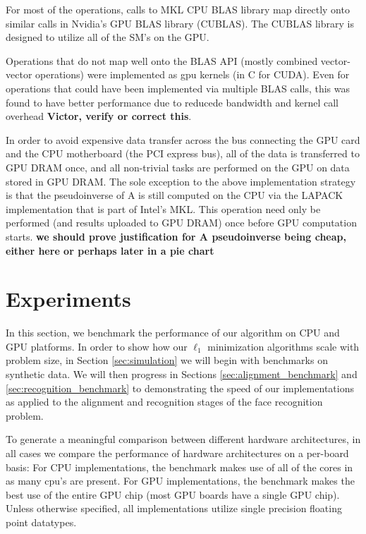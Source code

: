 \documentclass[10pt,twocolumn,letterpaper]{article}
\begin{document}
For most of the operations, calls to MKL CPU BLAS library map directly onto
similar calls in Nvidia's GPU BLAS library (CUBLAS).  The CUBLAS library is
designed to utilize all of the SM's on the GPU.  

Operations that do not map well onto the BLAS API (mostly combined
vector-vector operations) were implemented as gpu kernels (in C for CUDA).
Even for operations that could have been implemented via multiple BLAS calls,
this was found to have better performance due to reducede bandwidth and kernel
call overhead {\bf Victor, verify or correct this}.

In order to avoid expensive data transfer across the bus connecting the GPU
card and the CPU motherboard (the PCI express bus), all of the data is
transferred to GPU DRAM once, and all non-trivial tasks are performed on the
GPU on data stored in GPU DRAM.  The sole exception to the above implementation
strategy is that the pseudoinverse of A is still computed on the CPU via the
LAPACK implementation that is part of Intel's MKL. This operation need only be
performed (and results uploaded to GPU DRAM) once before GPU computation
starts. {\bf we should prove justification for A pseudoinverse being cheap,
either here or perhaps later in a pie chart}

\section{Experiments}

In this section, we benchmark the performance of our algorithm on CPU and GPU
platforms.  In order to show how our $\ell_1$ minimization algorithms scale
with problem size, in Section \ref{sec:simulation} we will begin with
benchmarks on synthetic data.  We will then progress in Sections
\ref{sec:alignment_benchmark} and \ref{sec:recognition_benchmark} to
demonstrating the speed of our implementations as applied to the alignment and
recognition stages of the face recognition problem.

To generate a meaningful comparison between different hardware architectures,
in all cases we compare the performance of hardware architectures on a
per-board basis:  For CPU implementations, the benchmark makes use of all of
the cores in as many cpu's are present.  For GPU implementations, the benchmark
makes the best use of the entire GPU chip (most GPU boards have a single GPU
chip).  Unless otherwise specified, all implementations utilize single
precision floating point datatypes.  
\end{document}
